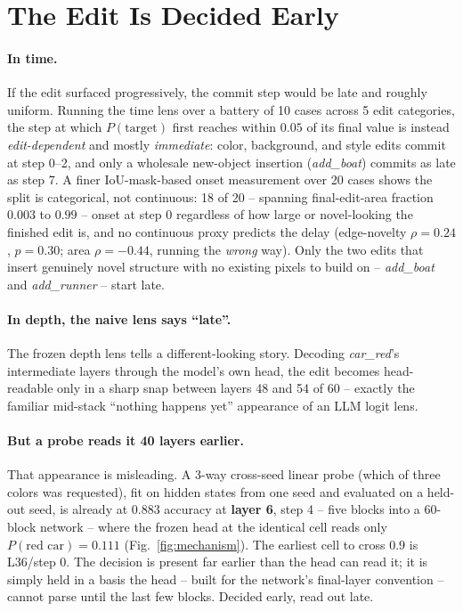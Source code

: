 \section{The Edit Is Decided Early}\label{sec:early}

\paragraph{In time.} If the edit surfaced progressively, the commit step
would be late and roughly uniform. Running the time lens over a battery of
10 cases across 5 edit categories, the step at which $P(\text{target})$
first reaches within $0.05$ of its final value is instead
\emph{edit-dependent} and mostly \emph{immediate}: color, background, and
style edits commit at step 0--2, and only a wholesale new-object
insertion (\emph{add\_boat}) commits as late as step 7. A finer
IoU-mask-based onset measurement over 20 cases shows the split is
categorical, not continuous: 18 of 20 -- spanning final-edit-area
fraction $0.003$ to $0.99$ -- onset at step 0 regardless of how large or
novel-looking the finished edit is, and no continuous proxy predicts the
delay (edge-novelty $\rho{=}0.24$, $p{=}0.30$; area $\rho{=}{-}0.44$,
running the \emph{wrong} way). Only the two edits that insert genuinely
novel structure with no existing pixels to build on -- \emph{add\_boat}
and \emph{add\_runner} -- start late.

\paragraph{In depth, the naive lens says ``late''.} The frozen depth lens
tells a different-looking story. Decoding \emph{car\_red}'s intermediate
layers through the model's own head, the edit becomes head-readable only
in a sharp snap between layers 48 and 54 of 60 -- exactly the familiar
mid-stack ``nothing happens yet'' appearance of an LLM logit lens.

\paragraph{But a probe reads it 40 layers earlier.} That appearance is
misleading. A 3-way cross-seed linear probe (which of three colors was
requested), fit on hidden states from one seed and evaluated on a
held-out seed, is already at $0.883$ accuracy at \textbf{layer 6}, step 4
-- five blocks into a 60-block network -- where the frozen head at the
identical cell reads only $P(\text{red car}){=}0.111$
(Fig.~\ref{fig:mechanism}). The earliest cell to cross $0.9$ is L36/step 0.
The decision is present far earlier than the head can read it; it is
simply held in a basis the head -- built for the network's final-layer
convention -- cannot parse until the last few blocks. Decided early, read
out late.

